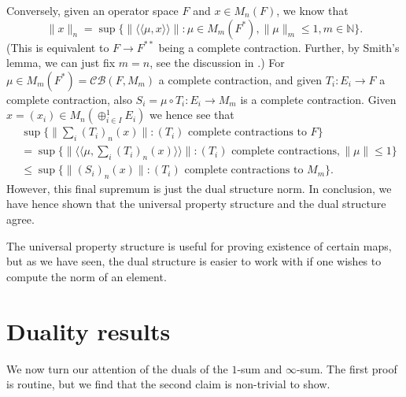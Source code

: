 \documentclass[a4paper,11pt]{article}
\theoremstyle{plain}
\theoremstyle{definition}
\newcommand{\mc}[1]{\mathcal{#1}}
\newcommand{\osip}[2]{\langle\langle{#1},{#2}\rangle\rangle}
\begin{document}
Conversely, given an operator space $F$ and $x\in M_n(F)$, we know that
\[ \|x\|_n = \sup\big\{ \|\osip{\mu}{x}\| : \mu\in M_m(F^*), \|\mu\|_m\leq 1,
m\in\mathbb N\big\}. \]
(This is equivalent to $F\rightarrow F^{**}$ being a complete contraction.  Further,
by Smith's lemma, we can just fix $m=n$, see the discussion in \cite[Section~3.2]{er}.)
For $\mu\in M_m(F^*) = \mc{CB}(F,M_m)$ a complete contraction, and given $T_i:E_i\rightarrow
F$ a complete contraction, also $S_i = \mu\circ T_i:E_i\rightarrow M_m$ is a complete
contraction.  Given $x=(x_i)\in M_n(\oplus_{i\in I}^1 E_i)$ we hence see that
\begin{align*}
& \sup\big\{ \|\sum_i (T_i)_n(x)\| : (T_i) \text{ complete contractions to }F\big\}\\
&= \sup\big\{ \|\osip{\mu}{\sum_i (T_i)_n(x)}\| : (T_i) \text{ complete contractions},
\|\mu\|\leq 1 \big\} \\
&\leq \sup\big\{ \|(S_i)_n(x)\| : (T_i) \text{ complete contractions to }M_m \big\}.
\end{align*}
However, this final supremum is just the dual structure norm.  In conclusion, we have
hence shown that the universal property structure and the dual structure agree.

The universal property structure is useful for proving existence of certain maps, but as
we have seen, the dual structure is easier to work with if one wishes to compute the
norm of an element.



\section{Duality results}

We now turn our attention of the duals of the $1$-sum and $\infty$-sum.  The first proof
is routine, but we find that the second claim is non-trivial to show.
\end{document}
